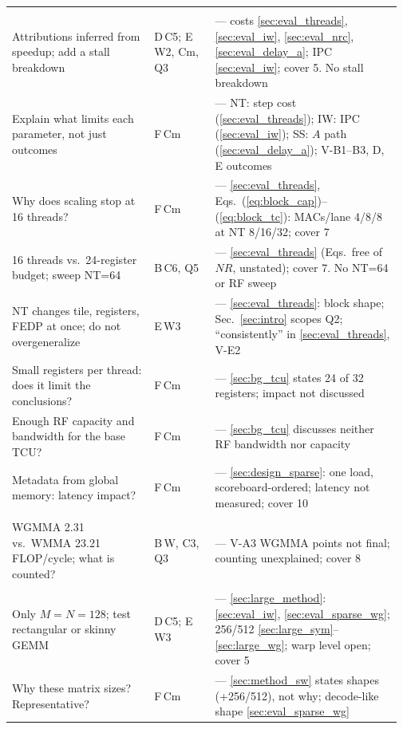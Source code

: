 \begin{longtable}{@{}p{0.355\linewidth} p{0.155\linewidth} p{0.46\linewidth}@{}}
\rowcolor{gray!18}\multicolumn{3}{@{}l@{}}{\textbf{Attribution and cycle-level evidence}} \\
Attributions inferred from speedup; add a stall breakdown & D\,C5; E\,W2, Cm, Q3 & \stP{} --- costs \ref{sec:eval_threads}, \ref{sec:eval_iw}, \ref{sec:eval_nrc}, \ref{sec:eval_delay_a}; IPC \ref{sec:eval_iw}; cover 5. No stall breakdown \\
Explain what limits each parameter, not just outcomes & F\,Cm & \stP{} --- NT: step cost (\ref{sec:eval_threads}); IW: IPC (\ref{sec:eval_iw}); SS: $A$ path (\ref{sec:eval_delay_a}); V-B1--B3, D, E outcomes \\
Why does scaling stop at 16 threads? & F\,Cm & \stR{} --- \ref{sec:eval_threads}, Eqs.~(\ref{eq:block_cap})--(\ref{eq:block_tc}): MACs/lane 4/8/8 at NT 8/16/32; cover 7 \\
16 threads vs.\ 24-register budget; sweep NT=64 & B\,C6, Q5 & \stP{} --- \ref{sec:eval_threads} (Eqs.\ free of $\mathit{NR}$, unstated); cover 7. No NT=64 or RF sweep \\
NT changes tile, registers, FEDP at once; do not overgeneralize & E\,W3 & \stP{} --- \ref{sec:eval_threads}: block shape; Sec.~\ref{sec:intro} scopes Q2; ``consistently'' in \ref{sec:eval_threads}, V-E2 \\
Small registers per thread: does it limit the conclusions? & F\,Cm & \stO{} --- \ref{sec:bg_tcu} states 24 of 32 registers; impact not discussed \\
Enough RF capacity and bandwidth for the base TCU? & F\,Cm & \stO{} --- \ref{sec:bg_tcu} discusses neither RF bandwidth nor capacity \\
Metadata from global memory: latency impact? & F\,Cm & \stP{} --- \ref{sec:design_sparse}: one load, scoreboard-ordered; latency not measured; cover 10 \\
\rowcolor{gray!18}\multicolumn{3}{@{}l@{}}{\textbf{Roofline}} \\
WGMMA 2.31 vs.\ WMMA 23.21 FLOP/cycle; what is counted? & B\,W, C3, Q3 & \stO{} --- V-A3 WGMMA points not final; counting unexplained; cover 8 \\
\rowcolor{gray!18}\multicolumn{3}{@{}l@{}}{\textbf{Design-space coverage and shapes}} \\
Only $M{=}N{=}128$; test rectangular or skinny GEMM & D\,C5; E\,W3 & \stP{} --- \ref{sec:large_method}: \ref{sec:eval_iw}, \ref{sec:eval_sparse_wg}; 256/512 \ref{sec:large_sym}--\ref{sec:large_wg}; warp level open; cover 5 \\
Why these matrix sizes? Representative? & F\,Cm & \stP{} --- \ref{sec:method_sw} states shapes (+256/512), not why; decode-like shape \ref{sec:eval_sparse_wg} \\

\end{longtable}
